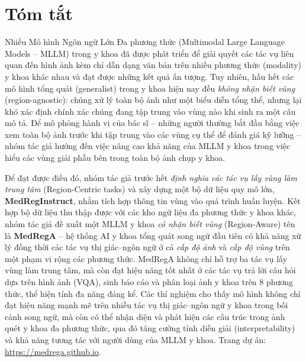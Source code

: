 \documentclass[12pt,a4paper,oneside]{extarticle}
\begin{document}
\renewcommand{\contentsname}{MỤC LỤC}
\tableofcontents
\newpage

\setcounter{page}{1}

\section*{Tóm tắt}

Nhiều Mô hình Ngôn ngữ Lớn Đa phương thức (Multimodal Large Language Models -- MLLM)
trong y khoa đã được phát triển để giải quyết các tác vụ liên quan đến hình ảnh kèm
chỉ dẫn dạng văn bản trên nhiều phương thức (modality) y khoa khác nhau và đạt được
những kết quả ấn tượng. Tuy nhiên, hầu hết các mô hình tổng quát (generalist) trong y
khoa hiện nay đều \emph{không nhận biết vùng} (region-agnostic): chúng xử lý toàn bộ ảnh
như một biểu diễn tổng thể, nhưng lại khó xác định chính xác chúng
đang tập trung vào vùng nào khi sinh ra một câu mô tả. Để mô phỏng hành vi của bác sĩ --
những người thường bắt đầu bằng việc xem toàn bộ ảnh trước khi tập trung vào các vùng cụ
thể để đánh giá kỹ lưỡng -- nhóm tác giả hướng đến việc nâng cao khả năng của MLLM y khoa
trong việc hiểu các vùng giải phẫu bên trong toàn bộ ảnh chụp y khoa.

Để đạt được điều đó, nhóm tác giả trước hết \emph{định nghĩa các tác vụ lấy vùng làm trung
tâm} (Region-Centric tasks) và xây dựng một bộ dữ liệu quy mô lớn, \textbf{MedRegInstruct},
nhằm tích hợp thông tin vùng vào quá trình huấn luyện. Kết hợp bộ dữ liệu thu thập được với
các kho ngữ liệu đa phương thức y khoa khác, nhóm tác giả đề xuất một MLLM y khoa \emph{có
nhận biết vùng} (Region-Aware) tên là \textbf{MedRegA} -- hệ thống AI y khoa tổng quát song
ngữ đầu tiên có khả năng xử lý đồng thời các tác vụ thị giác--ngôn ngữ ở cả \emph{cấp độ ảnh}
và \emph{cấp độ vùng} trên một phạm vi rộng các phương thức. MedRegA không chỉ hỗ trợ ba tác
vụ lấy vùng làm trung tâm, mà còn đạt hiệu năng tốt nhất ở các tác vụ trả lời câu hỏi dựa trên
hình ảnh (VQA), sinh báo cáo và phân loại ảnh y khoa trên 8 phương thức, thể hiện tính đa năng
đáng kể. Các thí nghiệm cho thấy mô hình không chỉ đạt hiệu năng mạnh mẽ trên nhiều tác vụ
thị giác--ngôn ngữ y khoa trong bối cảnh song ngữ, mà còn có thể nhận diện và phát hiện các
cấu trúc trong ảnh quét y khoa đa phương thức, qua đó tăng cường tính diễn giải
(interpretability) và khả năng tương tác với người dùng của MLLM y khoa. Trang dự án:
\url{https://medrega.github.io}.
\end{document}
